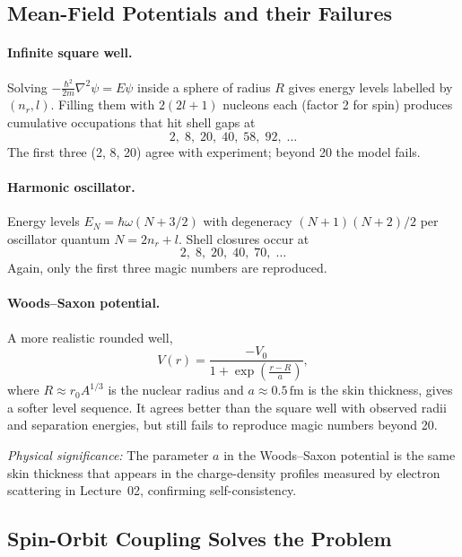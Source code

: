 \subsection{Mean-Field Potentials and their Failures}

\paragraph{Infinite square well.}
Solving $-\frac{\hbar^2}{2m}\nabla^2\psi=E\psi$ inside a sphere of radius $R$
gives energy levels labelled by $(n_r,l)$.  Filling them with $2(2l+1)$
nucleons each (factor 2 for spin) produces cumulative occupations that hit
shell gaps at
\[
  2,\;8,\;20,\;40,\;58,\;92,\;\ldots
\]
The first three (2, 8, 20) agree with experiment; beyond 20 the model fails.

\paragraph{Harmonic oscillator.}
Energy levels $E_N=\hbar\omega(N+3/2)$ with degeneracy $(N+1)(N+2)/2$ per
oscillator quantum $N=2n_r+l$.  Shell closures occur at
\[
  2,\;8,\;20,\;40,\;70,\;\ldots
\]
Again, only the first three magic numbers are reproduced.

\paragraph{Woods–Saxon potential.}
A more realistic rounded well,
\begin{equation}
  \label{eq:lec04:woods_saxon}
  \boxed{V(r)=\frac{-V_0}{1+\exp\!\left(\frac{r-R}{a}\right)},}
\end{equation}
where $R\approx r_0 A^{1/3}$ is the nuclear radius and $a\approx0.5\,\mathrm{fm}$
is the skin thickness, gives a softer level sequence.  It agrees better than
the square well with observed radii and separation energies, but still fails to
reproduce magic numbers beyond 20.

\textit{Physical significance:} The parameter $a$ in the Woods–Saxon potential
is the same skin thickness that appears in the charge-density profiles measured
by electron scattering in Lecture~02, confirming self-consistency.

\subsection{Spin-Orbit Coupling Solves the Problem}

